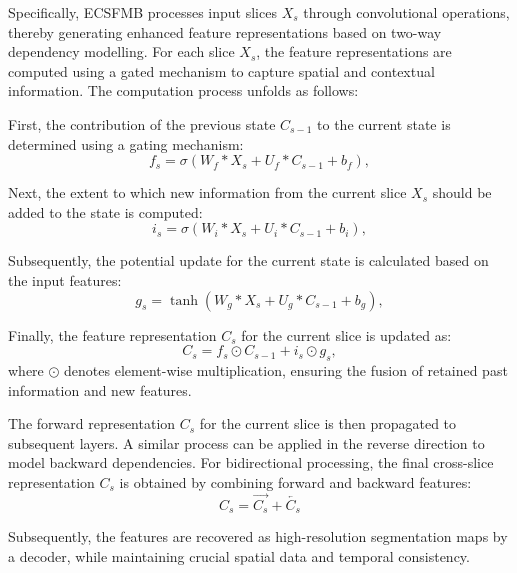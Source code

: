 \documentclass[AMA,Times1COL]{WileyNJDv5} %
\begin{document}
Specifically, ECSFMB processes input slices $X_s$ through convolutional operations, thereby generating enhanced feature representations based on two-way dependency modelling. For each slice \( X_s \), the feature representations are computed using a gated mechanism to capture spatial and contextual information. The computation process unfolds as follows:

First, the contribution of the previous state \( C_{s-1} \) to the current state is determined using a gating mechanism:
\begin{equation}
    f_s = \sigma(W_f \ast X_s + U_f \ast C_{s-1} + b_f),
\end{equation}

Next, the extent to which new information from the current slice \( X_s \) should be added to the state is computed:
\begin{equation}
    i_s = \sigma(W_i \ast X_s + U_i \ast C_{s-1} + b_i),
\end{equation}

Subsequently, the potential update for the current state is calculated based on the input features:
\begin{equation}
    g_s = \tanh(W_g \ast X_s + U_g \ast C_{s-1} + b_g),
\end{equation}

Finally, the feature representation \( C_s \) for the current slice is updated as:
\begin{equation}
    C_s = f_s \odot C_{s-1} + i_s \odot g_s,
\end{equation}
where \( \odot \) denotes element-wise multiplication, ensuring the fusion of retained past information and new features.

The forward representation \( C_s \) for the current slice is then propagated to subsequent layers. A similar process can be applied in the reverse direction to model backward dependencies. For bidirectional processing, the final cross-slice representation \( C_s \) is obtained by combining forward and backward features: 
\begin{equation}
   C_s = \overrightarrow{C_s} + \overleftarrow{C_s} 
\end{equation}

Subsequently, the features are recovered as high-resolution segmentation maps by a decoder, while maintaining crucial spatial data and temporal consistency. 
\end{document}
